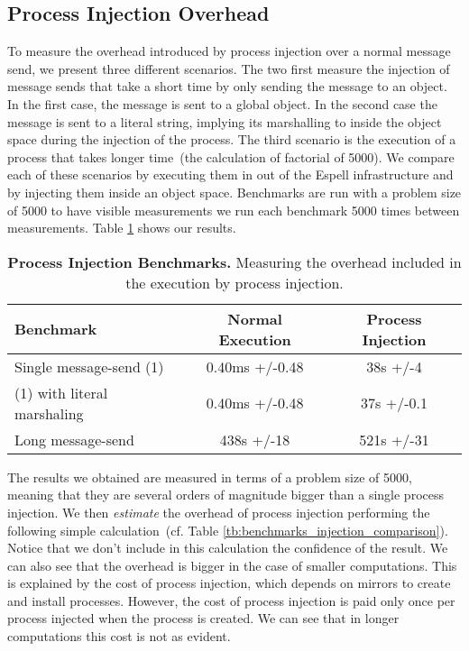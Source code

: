 \subsection{Process Injection Overhead}

To measure the overhead introduced by process injection over a normal message send, we present three different scenarios. The two first measure the injection of message sends that take a short time by only sending the  message to an object. In the first case, the message is sent to a global object. In the second case the message is sent to a literal string, implying its marshalling to inside the object space during the injection of the process. The third scenario is the execution of a process that takes longer time~(the calculation of factorial of 5000). We compare each of these scenarios by executing them in out of the Espell infrastructure and by injecting them inside an object space. Benchmarks are run with a problem size of 5000 to have visible measurements \ie we run each benchmark 5000 times between measurements. Table \ref{tb:benchmarks_injection} shows our results.

\begin{table}[ht]

 	\centering
 	\begin{tabular}{lcc}%
			\toprule
			\textbf{Benchmark}
 			& \textbf{Normal Execution}
			& \textbf{Process Injection}\\
		\midrule
		Single message-send (1) &0.40ms +/-0.48 & 38s +/-4 \\\midrule
		(1) with literal marshaling & 0.40ms +/-0.48 & 37s +/-0.1 \\\midrule
		Long message-send & 438s +/-18 & 521s +/-31\\\midrule
 	\end{tabular}
	\vspace*{0.2cm}
 	\caption{\textbf{Process Injection Benchmarks.} Measuring the overhead included in the execution by process injection.\label{tb:benchmarks_injection}}
 \end{table}

The results we obtained are measured in terms of a problem size of 5000, meaning that they are several orders of magnitude bigger than a single process injection. We then \emph{estimate} the overhead of process injection performing the following simple calculation~(cf. Table \ref{tb:benchmarks_injection_comparison}). Notice that we don't include in this calculation the confidence of the result. We can also see that the overhead is bigger in the case of smaller computations. This is explained by the cost of process injection, which depends on mirrors to create and install processes. However, the cost of process injection is paid only once per process injected when the process is created. We can see that in longer computations this cost is not as evident.


